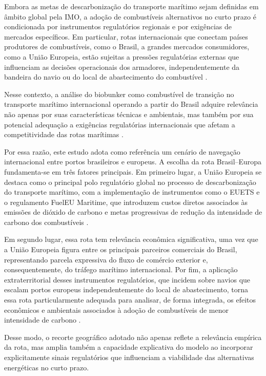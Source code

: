 Embora as metas de descarbonização do transporte marítimo sejam definidas em âmbito global pela \gls{IMO}, a adoção de combustíveis alternativos no curto prazo é condicionada por instrumentos regulatórios regionais e por exigências de mercados específicos. Em particular, rotas internacionais que conectam países produtores de combustíveis, como o Brasil, a grandes mercados consumidores, como a União Europeia, estão sujeitas a pressões regulatórias externas que influenciam as decisões operacionais dos armadores, independentemente da bandeira do navio ou do local de abastecimento do combustível \citep{eu_reg_2023_957,eu_reg_2023_1805}.

Nesse contexto, a análise do biobunker como combustível de transição no transporte marítimo internacional operando a partir do Brasil adquire relevância não apenas por suas características técnicas e ambientais, mas também por sua potencial adequação a exigências regulatórias internacionais que afetam a competitividade das rotas marítimas \citep{carvalho_biofuels_2021,eu_reg_2023_957}.

Por essa razão, este estudo adota como referência um cenário de navegação internacional entre portos brasileiros e europeus. A escolha da rota Brasil–Europa fundamenta-se em três fatores principais. Em primeiro lugar, a União Europeia se destaca como o principal polo regulatório global no processo de descarbonização do transporte marítimo, com a implementação de instrumentos como o \gls{EUETS} e o regulamento FuelEU Maritime, que introduzem custos diretos associados às emissões de dióxido de carbono e metas progressivas de redução da intensidade de carbono dos combustíveis \citep{eu_reg_2023_957,eu_reg_2023_1805}.

Em segundo lugar, essa rota tem relevância econômica significativa, uma vez que a União Europeia figura entre os principais parceiros comerciais do Brasil, representando parcela expressiva do fluxo de comércio exterior e, consequentemente, do tráfego marítimo internacional. Por fim, a aplicação extraterritorial desses instrumentos regulatórios, que incidem sobre navios que escalam portos europeus independentemente do local de abastecimento, torna essa rota particularmente adequada para analisar, de forma integrada, os efeitos econômicos e ambientais associados à adoção de combustíveis de menor intensidade de carbono \citep{carvalho_biofuels_2021,eu_reg_2023_957}.

Desse modo, o recorte geográfico adotado não apenas reflete a relevância empírica da rota, mas amplia também a capacidade explicativa do modelo ao incorporar explicitamente sinais regulatórios que influenciam a viabilidade das alternativas energéticas no curto prazo.

